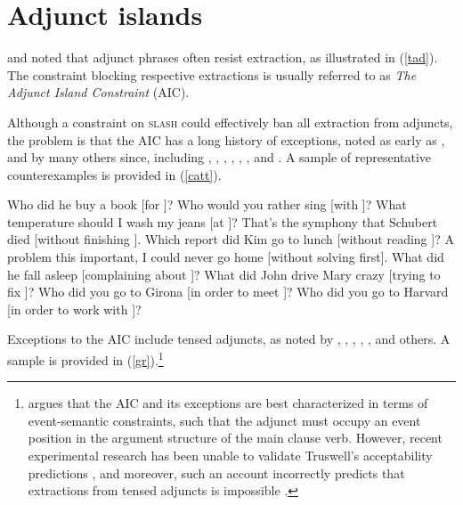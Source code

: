 \documentclass[output=paper,biblatex,babelshorthands,newtxmath,draftmode,colorlinks,citecolor=brown]{langscibook}
\begin{document}
\section{Adjunct islands}

\citet{cattell} and \citet{huang82} noted that adjunct phrases often resist extraction, as
illustrated in (\ref{tad}). The constraint blocking respective extractions is usually referred to as
\emph{The Adjunct Island Constraint} (AIC).

\eal  \label{tad}
\zl

Although a constraint on \textsc{slash} could effectively ban all extraction from adjuncts, the problem
is that the AIC has a long history of exceptions, noted as early as \citet[38]{cattell}, and by many
others since, including \citet[72]{chomsky82}, \citet{engdahl}, \citet[103]{hegarty90},
\citet[139]{cinque}, \citet[191]{pollardsag}, \citet[253]{culicover87}, and \citet[]{borg}. A sample of
representative counterexamples is provided in (\ref{catt}).


\ealnoraggedright \label{catt}
\ex Who did he buy a book [for \spc]?
\ex Who would you rather sing [with \spc]?
\ex What temperature should I wash my jeans [at \spc]?
\ex That's the symphony that Schubert died [without finishing \spc].
\ex Which report did Kim go to lunch [without reading \spc]?
\ex A problem this important, I could never go home [without solving \spcs first].
\ex What did he fall asleep [complaining about \spc]?
\ex What did John drive Mary crazy [trying to fix \spc]?
\ex Who did you go to Girona [in order to meet \spc]?
\ex Who did you go to Harvard [in order to work with \spc]?
\zl


Exceptions to the AIC include tensed adjuncts, as noted by \citet[88]{grosu81}, \citet[29]{deane}, \citet[287]{levhubook}, \citet[144]{gold06}, \citet[471]{chavesextr}, \citet[175,
ft.\,1]{truswellbook} and others. A sample is provided in (\ref{gr}).\footnote{\citet{truswellbook}
  argues that the AIC and its exceptions are best characterized in terms of event-semantic
  constraints, such that the adjunct must occupy an event position in the argument structure of the
  main clause verb. However, recent experimental research has been unable to validate Truswell's
  acceptability predictions \citep{kohrt}, and moreover, such an account incorrectly predicts that
  extractions from tensed adjuncts is impossible \citep[175, ft.\,1]{truswellbook}.}
 
\end{document}
